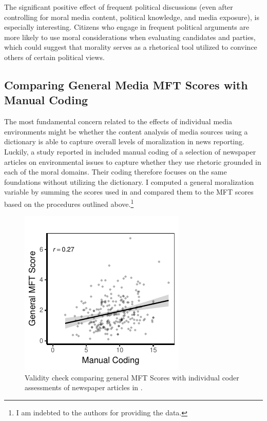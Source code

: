 \documentclass[12pt]{article}
\begin{document}
The significant positive effect of frequent political discussions (even after controlling for moral media content, political knowledge, and media exposure), is especially interesting. Citizens who engage in frequent political arguments are more likely to use moral considerations when evaluating candidates and parties, which could suggest that morality serves as a rhetorical tool utilized to convince others of certain political views.


\clearpage
\subsection{Comparing General Media MFT Scores with Manual Coding}

The most fundamental concern related to the effects of individual media environments might be whether the content analysis of media sources using a dictionary is able to capture overall levels of moralization in news reporting. Luckily, a study reported in \citet{feinberg2013moral} included manual coding of a selection of newspaper articles on environmental issues to capture whether they use rhetoric grounded in each of the moral domains. Their coding therefore focuses on the same foundations without utilizing the dictionary. I computed a general moralization variable by summing the scores used in \citet{feinberg2013moral} and compared them to the MFT scores based on the procedures outlined above.\footnote{I am indebted to the authors for providing the data.}

\begin{figure}[ht]\centering
\includegraphics{../calc/fig/feinberg_general.pdf}
\caption{Validity check comparing general MFT Scores with individual coder assessments of newspaper articles in \citet{feinberg2013moral}.}\label{fig:ols_feinberg}
\end{figure}
\end{document}
